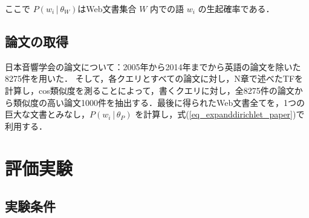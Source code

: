 ここで $P(w_i│θ_W)$はWeb文書集合 $W$ 内での語 $w_i$ の生起確率である．

\subsection{論文の取得}
日本音響学会の論文について：2005年から2014年までから英語の論文を除いた8275件を用いた．
そして，各クエリとすべての論文に対し，N章で述べたTFを計算し，cos類似度を測ることによって，書くクエリに対し，全8275件の論文から類似度の高い論文1000件を抽出する．最後に得られたWeb文書全てを，1つの巨大な文書とみなし，$P(w_i│θ_P)$ を計算し，式(\ref{eq_expanddirichlet_paper})で利用する．

\section{評価実験}
\subsection{実験条件}

